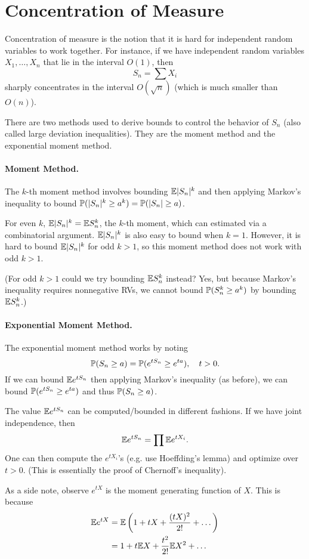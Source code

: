 \section*{Concentration of Measure}

Concentration of measure is the notion that it is hard for independent random variables to work together. For instance, if we have independent random variables $X_1, \dots, X_n$ that lie in the interval $O(1)$, then
\[
    S_n = \sum X_i
\]
sharply concentrates in the interval $O(\sqrt{n})$ (which is much smaller than $O(n)$).

There are two methods used to derive bounds to control the behavior of $S_n$ (also called large deviation inequalities). They are the moment method and the exponential moment method.

\paragraph{Moment Method.} The $k$-th moment method involves bounding ${\mathbb E} |S_n|^k$ and then applying Markov's inequality to bound ${\mathbb P}(|S_n|^k \geq a^k) = {\mathbb P}(|S_n| \geq a)$.

For even $k$, ${\mathbb E}|S_n|^k = {\mathbb E} S_n^k$, the $k$-th moment, which can estimated via a combinatorial argument. ${\mathbb E}|S_n|^k$ is also easy to bound when $k = 1$. However, it is hard to bound ${\mathbb E}|S_n|^k$ for odd $k > 1$, so this moment method does not work with odd $k > 1$.

(For odd $k > 1$ could we try bounding ${\mathbb E} S_n^k$ instead? Yes, but because Markov's inequality requires nonnegative RVs, we cannot bound ${\mathbb P}(S_n^k \geq a^k) $ by bounding ${\mathbb E} S_n^k$.)

\paragraph{Exponential Moment Method.} The exponential moment method works by noting
\[
    {\mathbb P}(S_n \geq a) = {\mathbb P}( e^{tS_n} \geq e^{ta}), \quad t > 0.
\]
If we can bound ${\mathbb E} e^{tS_n}$ then applying Markov's inequality (as before), we can bound ${\mathbb P}( e^{tS_n} \geq e^{ta})$ and thus ${\mathbb P}(S_n \geq a)$.

The value ${\mathbb E} e^{tS_n}$ can be computed/bounded in different fashions. If we have joint independence, then
\[
    {\mathbb E} e^{tS_n} = \prod {\mathbb E} e^{tX_i}.
\]
One can then compute the $e^{tX_i}$'s (e.g. use Hoeffding's lemma) and optimize over $t > 0$. (This is essentially the proof of Chernoff's inequality).

As a side note, observe $e^{tX}$ is the moment generating function of $X$. This is because
\[
    \begin{split}
        {\mathbb E} e^{tX} & = {\mathbb E} \left( 1 + tX + \frac{(tX)^2}{2!} + \dots \right) \\
                   & = 1 + t{\mathbb E} X + \frac{t^2}{2!}{\mathbb E} X^2 + \dots
    \end{split}
\]

